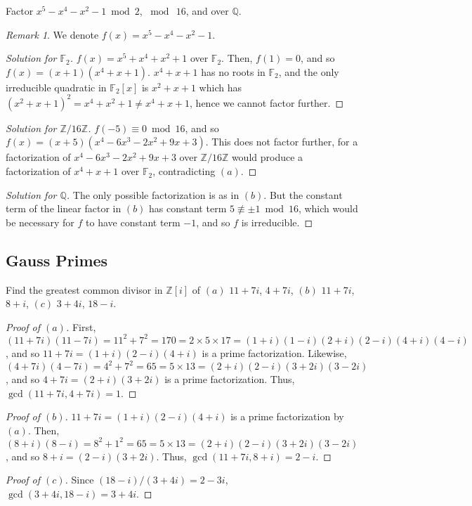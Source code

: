 \documentclass[12pt]{article}
\theoremstyle{remark}
\newtheorem*{remark}{Remark}
\begin{document}
\setcounter{subsubsection}{18}
\begin{problem}\label{exc:12.4.19}
  Factor $x^5 - x^4 - x^2 - 1 \bmod 2$, $\bmod\ 16$, and over $\mathbb{Q}$.
\end{problem}
\begin{remark}
  We denote $f(x) = x^5 - x^4 - x^2 - 1$.
\end{remark}
\begin{proof}[Solution for $\mathbb{F}_2$]
  $f(x) = x^5 + x^4 + x^2 + 1$ over $\mathbb{F}_2$. Then, $f(1) = 0$, and so $f(x) = (x+1)(x^4 + x + 1)$. $x^4+x+1$ has no roots in $\mathbb{F}_2$, and the only irreducible quadratic in $\mathbb{F}_2[x]$ is $x^2+x+1$ which has $(x^2+x+1)^2 = x^4 + x^2 + 1 \ne x^4 + x + 1$, hence we cannot factor further.
\end{proof}
\begin{proof}[Solution for $\mathbb{Z}/16\mathbb{Z}$]
  $f(-5) \equiv 0 \bmod 16$, and so $f(x) = (x+5)(x^4 - 6 x^3 - 2 x^2 + 9 x + 3)$. This does not factor further, for a factorization of $x^4 - 6 x^3 - 2 x^2 + 9 x + 3$ over $\mathbb{Z}/16\mathbb{Z}$ would produce a factorization of $x^4+x+1$ over $\mathbb{F}_2$, contradicting $(a)$.
\end{proof}
\begin{proof}[Solution for $\mathbb{Q}$]
  The only possible factorization is as in $(b)$. But the constant term of the linear factor in $(b)$ has constant term $5 \not\equiv \pm1 \bmod 16$, which would be necessary for $f$ to have constant term $-1$, and so $f$ is irreducible.
\end{proof}

\subsection{Gauss Primes}
\setcounter{subsubsection}{1}
\begin{problem}\label{exc:12.5.2}
  Find the greatest common divisor in $\mathbb{Z}[i]$ of $(a)$ $11 + 7i$, $4 + 7i$, $(b)$ $11 + 7i$, $8 + i$, $(c)$ $3+4i$, $18-i$.
\end{problem}
\begin{proof}[Proof of $(a)$]
  First, $(11 + 7i)(11 - 7i) = 11^2 + 7^2 = 170 = 2 \times 5 \times 17 = (1+i)(1-i)(2+i)(2-i)(4+i)(4-i)$, and so $11+7i = (1+i)(2-i)(4+i)$ is a prime factorization. Likewise, $(4 + 7i)(4 - 7i) = 4^2 + 7^2 = 65 = 5 \times 13 = (2+i)(2-i)(3+2i)(3-2i)$, and so $4+7i = (2+i)(3+2i)$ is a prime factorization. Thus, $\gcd(11 + 7i,4 + 7i) = 1$.
\end{proof}
\begin{proof}[Proof of $(b)$]
  $11+7i = (1+i)(2-i)(4+i)$ is a prime factorization by $(a)$. Then, $(8+i)(8-i) = 8^2+1^2 = 65 = 5 \times 13 = (2+i)(2-i)(3+2i)(3-2i)$, and so $8+i = (2-i)(3+2i)$. Thus, $\gcd(11+7i,8+i) = 2-i$.
\end{proof}
\begin{proof}[Proof of $(c)$]
  Since $(18-i)/(3+4i) = 2-3i$, $\gcd(3+4i,18-i) = 3+4i$.
\end{proof}
\end{document}
